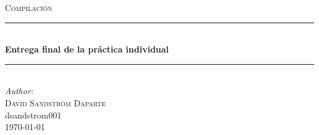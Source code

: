 \documentclass[12pt,a4paper, landscape]{article}
\theoremstyle{mytheor}
\begin{document}
\begin{titlepage}

  \newcommand{\HRule}{\rule{\linewidth}{0.5mm}} %
  
  \center %
   
  
  \textsc{\LARGE Compilación}\\[1.5cm] %
  
  
  \HRule \\[0.4cm]
  { \huge \bfseries Entrega final de la práctica individual}\\[0.4cm] %
  \HRule \\[1.5cm]
   
  
  
	\Large \emph{Author:}\\
 \textsc{David Sandström Daparte}\\
 dsandstrom001
  \\[2cm] %
  
  
  {\large \today}\\[1cm] %
  
 

\end{titlepage}
\end{document}
